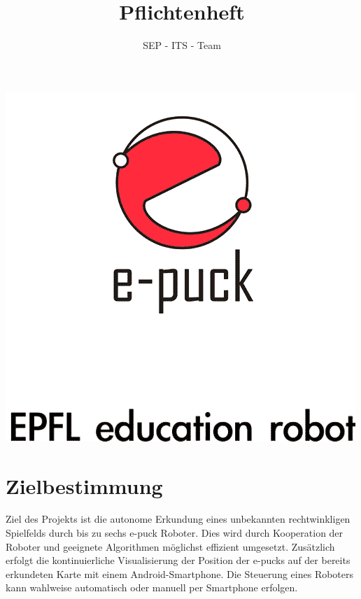\documentclass[10pt,a4paper]{article}
\author{SEP - ITS - Team}
\title{Pflichtenheft}
\begin{document}
	\maketitle
	\includegraphics[scale=0.5, origin=c]{logo.png}
	\newpage
	\section{Zielbestimmung}
		Ziel des Projekts ist die autonome Erkundung eines unbekannten rechtwinkligen Spielfelds durch bis zu
		sechs e-puck Roboter. Dies wird durch Kooperation der Roboter und geeignete Algorithmen möglichst
		effizient umgesetzt. Zusätzlich erfolgt die kontinuierliche Visualisierung der Position der e-pucks auf der
		bereits erkundeten Karte mit einem Android-Smartphone. Die Steuerung eines Roboters kann wahlweise
		automatisch oder manuell per Smartphone erfolgen.
\end{document}
